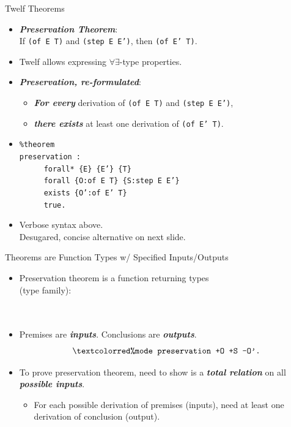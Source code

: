 \documentclass{beamer}
\renewcommand{\emph}[1]{\textbf{\textit{#1}}}
\begin{document}
\begin{frame}{Twelf Theorems}
\begin{itemize}
\item
\emph{Preservation Theorem}: \\
If \texttt{(of E T)} and \texttt{(step E E')}, then \texttt{(of E' T)}.

\pause
\item
Twelf allows expressing $\forall \exists$-type properties.

\item
\emph{Preservation, re-formulated}:
  \begin{itemize}
  \item \emph{For every} derivation of \texttt{(of E T)} and \texttt{(step E E')},
  \item \emph{there exists} at least one derivation of \texttt{(of E' T)}.
  \end{itemize}

\pause

\item
{
\color{red}
\texttt{\%theorem } \\
\texttt{preservation :} \\
$\qquad$ \texttt{ forall* \{E\} \{E'\} \{T\} } \\
$\qquad$ \texttt{ forall \{O:of E T\} \{S:step E E'\} } \\
$\qquad$ \texttt{ exists \{O':of E' T\} } \\
$\qquad$ \texttt{ true. }
}

\item Verbose syntax above. \\
Desugared, concise alternative on next slide.

\end{itemize}
\end{frame}


\begin{frame}{Theorems are Function Types w/ Specified Inputs/Outputs}
\begin{itemize}
\item Preservation theorem is a function returning types \\
(type family): \\
\texttt{} \\
$\qquad$ \texttt{}
\item Premises are \emph{inputs}. Conclusions are \emph{outputs}.
\[
\texttt{\cemph{\%mode preservation +O +S -O'.}}
\]

\item
To prove preservation theorem, need to show \texttt{}
is a \emph{total relation} on all \emph{possible inputs}.
	\begin{itemize}
	\item For each possible derivation of premises (inputs),
	need at least one derivation of conclusion (output).
	\end{itemize}
\end{itemize}
\end{frame}
\end{document}
